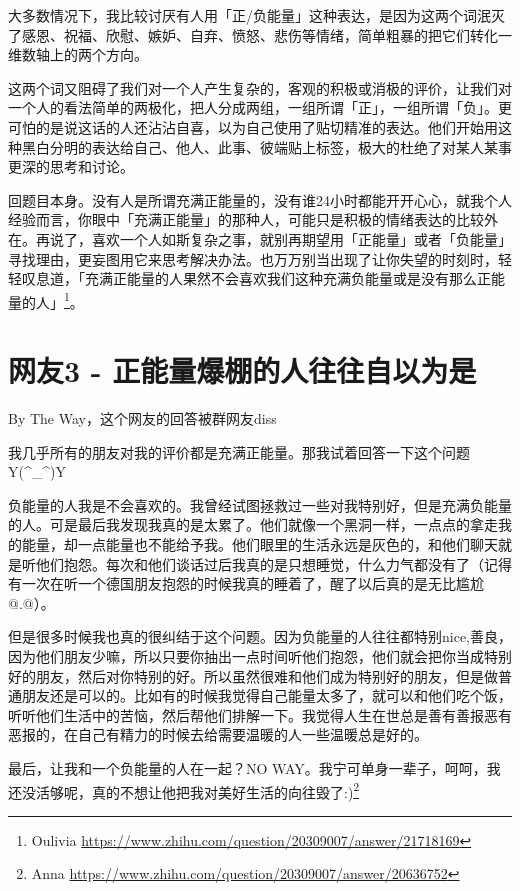 大多数情况下，我比较讨厌有人用「正/负能量」这种表达，是因为这两个词泯灭了感恩、祝福、欣慰、嫉妒、自弃、愤怒、悲伤等情绪，简单粗暴的把它们转化一维数轴上的两个方向。

这两个词又阻碍了我们对一个人产生复杂的，客观的积极或消极的评价，让我们对一个人的看法简单的两极化，把人分成两组，一组所谓「正」，一组所谓「负」。更可怕的是说这话的人还沾沾自喜，以为自己使用了贴切精准的表达。他们开始用这种黑白分明的表达给自己、他人、此事、彼端贴上标签，极大的杜绝了对某人某事更深的思考和讨论。

回题目本身。没有人是所谓充满正能量的，没有谁24小时都能开开心心，就我个人经验而言，你眼中「充满正能量」的那种人，可能只是积极的情绪表达的比较外在。再说了，喜欢一个人如斯复杂之事，就别再期望用「正能量」或者「负能量」寻找理由，更妄图用它来思考解决办法。也万万别当出现了让你失望的时刻时，轻轻叹息道，「充满正能量的人果然不会喜欢我们这种充满负能量或是没有那么正能量的人」\footnote{Oulivia \quad \url{https://www.zhihu.com/question/20309007/answer/21718169}}。

\section{网友3 - 正能量爆棚的人往往自以为是}

By The Way，这个网友的回答被群网友diss

我几乎所有的朋友对我的评价都是充满正能量。那我试着回答一下这个问题Y(^_^)Y

负能量的人我是不会喜欢的。我曾经试图拯救过一些对我特别好，但是充满负能量的人。可是最后我发现我真的是太累了。他们就像一个黑洞一样，一点点的拿走我的能量，却一点能量也不能给予我。他们眼里的生活永远是灰色的，和他们聊天就是听他们抱怨。每次和他们谈话过后我真的是只想睡觉，什么力气都没有了（记得有一次在听一个德国朋友抱怨的时候我真的睡着了，醒了以后真的是无比尴尬@.@）。

但是很多时候我也真的很纠结于这个问题。因为负能量的人往往都特别nice,善良，因为他们朋友少嘛，所以只要你抽出一点时间听他们抱怨，他们就会把你当成特别好的朋友，然后对你特别的好。所以虽然很难和他们成为特别好的朋友，但是做普通朋友还是可以的。比如有的时候我觉得自己能量太多了，就可以和他们吃个饭，听听他们生活中的苦恼，然后帮他们排解一下。我觉得人生在世总是善有善报恶有恶报的，在自己有精力的时候去给需要温暖的人一些温暖总是好的。

最后，让我和一个负能量的人在一起？NO WAY。我宁可单身一辈子，呵呵，我还没活够呢，真的不想让他把我对美好生活的向往毁了:)\footnote{Anna \quad \url{https://www.zhihu.com/question/20309007/answer/20636752}}

